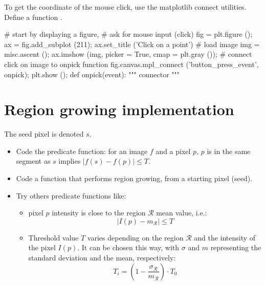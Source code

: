 \begin{pcomment}
To get the coordinate of the mouse click, use the matplotlib connect utilities. Define a function .
\begin{python}
# start by displaying a figure, 
# ask for mouse input (click)
fig = plt.figure ();
ax = fig.add_subplot (211);
ax.set_title ('Click on a point')
# load image
img = misc.ascent ();
ax.imshow (img, picker = True, cmap = plt.gray ());
# connect click on image to onpick function
fig.canvas.mpl_connect ('button_press_event', onpick);
plt.show ();
def onpick(event):
    """ connector """
\end{python}
\end{pcomment}


\section{Region growing implementation}
\begin{qbox}
The seed pixel is denoted $s$.
\begin{itemize}
 \item Code the predicate function: for an image $f$ and a pixel $p$, $p$ is in the same segment as $s$ implies $|f(s)-f(p)|\leq T$.
 \item Code a function that performs region growing, from a starting pixel (seed).
 \item Try others predicate functions like:
 \begin{itemize}
  \item pixel $p$ intensity is close to the region $\mathcal{R}$ mean value, i.e.: $$ |I(p)-m_\mathcal{R}|\leq T$$
  \item Threshold value $T$ varies depending on the region $\mathcal{R}$ and the intensity of the pixel $I(p)$. It can be chosen this way, with $\sigma$ and $m$ representing the standard deviation and the mean, respectively:
$$T_i=\left(1-\frac{\sigma_\mathcal{R}}{m_\mathcal{R}}\right)\cdot T_0$$
 \end{itemize}

\end{itemize}

\end{qbox}
